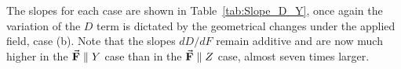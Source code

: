 \documentclass[12pt]{report}
\numberwithin{equation}{section}
\begin{document}
The slopes for each case are shown in Table~\ref{tab:Slope_D_Y}, once again the variation of the $D$ term is dictated by the geometrical changes under the applied field, case (b).
Note that the slopes $dD/dF$ remain additive and are now much higher in the $\vec{\vb{F}}\parallel Y$ case than in the $\vec{\vb{F}}\parallel Z$ case, almost seven times larger.
\begin{table}[!ht]
    \centering
    \caption{Slopes of the straight lines in cases (a), (b) and (c) for the D and E parameter for $\vec{\vb{F}}\parallel Y$}
    \label{tab:Slope_D_Y}
\end{table}
\end{document}
